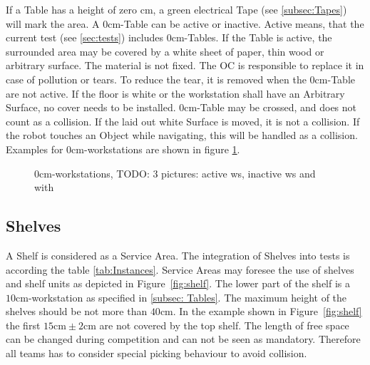 If a Table has a height of zero cm, a green electrical Tape (see \ref{subsec:Tapes}) will mark the area. A $0\si{\centi\meter}$-Table can be active or inactive. Active means, that the current test (see \ref{sec:tests}) includes $0\si{\centi\meter}$-Tables.
If the Table is active, the surrounded area may be covered by a white sheet of paper, thin wood or arbitrary surface. The material is not fixed.
The OC is responsible to replace it in case of pollution or tears. To reduce the tear, it is removed when the $0\si{\centi\meter}$-Table are not active. If the floor is white or the workstation shall have an Arbitrary Surface, no cover needs to be installed.
$0\si{\centi\meter}$-Table may be crossed, and does not count as a collision. If the laid out white Surface is moved, it is not a collision.
If the robot touches an Object while navigating, this will be handled as a collision. Examples for $0\si{\centi\meter}$-workstations are shown in figure \ref{fig:0cmws}.

\begin{figure} [h!]
	\begin{center}
		\missingfigure[figwidth=6cm]{}	
	\end{center}
	\caption{$0\si{\centi\meter}$-workstations, TODO: 3 pictures: active ws, inactive ws and with }
	\label{fig:0cmws}
\end{figure}

\subsection{Shelves}\label{sec:Shelves}


A Shelf is considered as a Service Area. The integration of Shelves into tests is according the table \ref{tab:Instances}. Service Areas may foresee the use of shelves and shelf units as depicted in Figure~\ref{fig:shelf}. The lower part of the shelf is a $10\si{\centi\meter}$-workstation as specified in \ref{subsec: Tables}.
The maximum height of the shelves should be not more than $40\si{\centi\meter}$. In the example shown in Figure~\ref{fig:shelf} the first $15 \si{\centi\meter}\pm 2\si{\centi\meter} $ are not covered by the top shelf. The length of free space can be changed during competition and can not be seen as mandatory. Therefore all teams has to consider special picking behaviour to avoid collision.  

